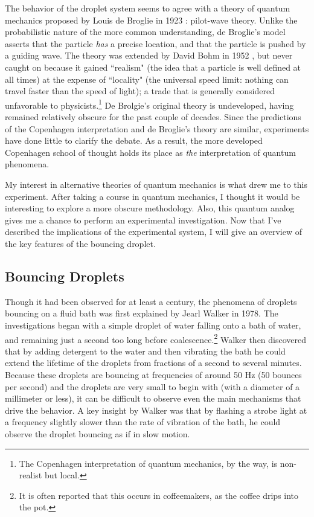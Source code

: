     The behavior of the droplet system seems to agree with a theory of quantum mechanics proposed by Louis de Broglie in 1923 : pilot-wave theory. Unlike the probabilistic nature of the more common understanding, de Broglie's model asserts that the particle \textit{has} a precise location, and that the particle is pushed by a guiding wave. The theory was extended by David Bohm in 1952 , but never caught on because it gained ``realism" (the idea that a particle is well defined at all times) at the expense of ``locality" (the universal speed limit: nothing can travel faster than the speed of light); a trade that is generally considered unfavorable to physicists.\footnote{The Copenhagen interpretation of quantum mechanics, by the way, is non-realist but local.} De Brolgie's original theory is undeveloped, having remained relatively obscure for the past couple of decades. Since the predictions of the Copenhagen interpretation and de Broglie's theory are similar, experiments have done little to clarify the debate. As a result, the more developed Copenhagen school of thought holds its place as \textit{the} interpretation of quantum phenomena. 
    
    My interest in alternative theories of quantum mechanics is what drew me to this experiment. After taking a course in quantum mechanics, I thought it would be interesting to explore a more obscure methodology. Also, this quantum analog gives me a chance to perform an experimental investigation. Now that I've  described the implications of the experimental system, I will give an overview of the key features of the bouncing droplet.
    
	    \subsection{Bouncing Droplets}
	    Though it had been observed for at least a century, the phenomena of droplets bouncing on a fluid bath was first explained by Jearl Walker in 1978. The investigations began with a simple droplet of water falling onto a bath of water, and remaining just a second too long before coalescence.\footnote{It is often reported that this occurs in coffeemakers, as the coffee drips into the pot.} Walker then discovered that by adding detergent to the water and then vibrating the bath he could extend the lifetime of the droplets from fractions of a second to several minutes. Because these droplets are bouncing at frequencies of around 50 Hz (50 bounces per second) and the droplets are very small to begin with (with a diameter of a millimeter or less), it can be difficult to observe even the main mechanisms that drive the behavior. A key insight by Walker was that by flashing a strobe light at a frequency slightly slower than the rate of vibration of the bath, he could observe the droplet bouncing as if in slow motion.
	    
